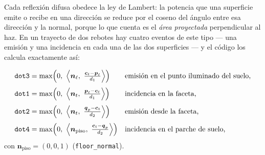 \documentclass[11pt,a4paper]{article}
\newcommand{\vect}[1]{\boldsymbol{#1}}
\newcommand{\code}[1]{\texttt{#1}}
\theoremstyle{definition}
\theoremstyle{plain}
\begin{document}
Cada reflexión difusa obedece la ley de Lambert: la potencia que una superficie
emite o recibe en una dirección se reduce por el coseno del ángulo entre esa
dirección y la normal, porque lo que cuenta es el \emph{área proyectada}
perpendicular al haz. En un trayecto de dos rebotes hay cuatro eventos de este
tipo --- una emisión y una incidencia en cada una de las dos superficies --- y
el código los calcula exactamente así:

\begin{equation}
\label{eq:dots}
\begin{aligned}
\text{\code{dot3}} &= \max\Bigl(0,\ \Bigl\langle \vect n_\ell,\
   \tfrac{\vect c_t-\vect p_\ell}{d_1}\Bigr\rangle\Bigr)
   &&\text{emisión en el punto iluminado del suelo,}\\[1mm]
\text{\code{dot1}} &= \max\Bigl(0,\ \Bigl\langle \vect n_t,\
   \tfrac{\vect p_\ell-\vect c_t}{d_1}\Bigr\rangle\Bigr)
   &&\text{incidencia en la faceta,}\\[1mm]
\text{\code{dot2}} &= \max\Bigl(0,\ \Bigl\langle \vect n_t,\
   \tfrac{\vect q_p-\vect c_t}{d_2}\Bigr\rangle\Bigr)
   &&\text{emisión desde la faceta,}\\[1mm]
\text{\code{dot4}} &= \max\Bigl(0,\ \Bigl\langle \vect n_{\text{piso}},\
   \tfrac{\vect c_t-\vect q_p}{d_2}\Bigr\rangle\Bigr)
   &&\text{incidencia en el parche de suelo,}
\end{aligned}
\end{equation}
%
con $\vect n_{\text{piso}}=(0,0,1)$ (\code{floor\_normal}).
\end{document}
